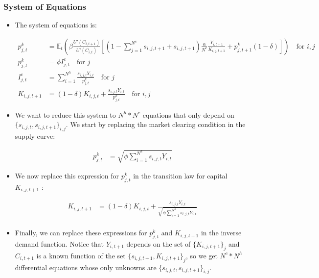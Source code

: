 \documentclass[11pt,english]{article}
\newcommand{\E}{\mathbb{E}}
\begin{document}
\subsubsection{System of Equations}

\begin{itemize}
	
	\item The system of equations is:
	
	\begin{align*}
	p^k_{j,t}  & =   \E_t \left( \beta \frac{U'(C_{i,t+1})}{U'(C_{i,t})} \left[ (1-\sum_{j=1}^{N^c} s_{i,j,t+1} + s_{i,j,t+1}) \frac{\alpha}{N^c} \frac{Y_{i,t+1}}{K_{i,j,t+1}} + p^k_{j,t+1} (1-\delta)  \right]  \right) \quad \text{for } i,j \\
	p^k_{j,t} & = \phi I^c_{j,t} \quad \text{for } j\\
	I_{j,t}^c & = \sum_{i=1}^{N^h} \frac{ s_{i,j,t} Y_{i,t} }{p^k_{j,t}}  \quad \text{for } j\\
	K_{i,j,t+1} & = (1-\delta) K_{i,j,t} + \frac{s_{i,j,t} Y_{i,t}}{p^k_{j,t}} \quad \text{for } i,j
	\end{align*}
	
	\item We want to reduce this system to $N^h*N^c$ equations that only depend on $\{s_{i,j,t}, s_{i,j,t+1}\}_{i,j}$. We start by replacing the market clearing condition in the supply curve:
	
	\begin{align*}
	p^k_{j,t} & = \sqrt{\phi \sum_{i=1}^{N^h}  s_{i,j,t} Y_{i,t}}
	\end{align*}
	
	\item We now replace this expression for $p^k_{j,t}$ in the transition law for capital $K_{i,j,t+1}$ :
	
	\begin{align}
	K_{i,j,t+1} & = (1-\delta) K_{i,j,t} + \frac{s_{i,j,t} Y_{i,t}}{ \sqrt{\phi \sum_{i=1}^{N^h}  s_{i,j,t} Y_{i,t}}} \\
	\end{align}
	
	\item Finally, we can replace these expressions for $p^k_{j,t}$ and $K_{i,j,t+1}$ in the inverse demand function. Notice that $Y_{i,t+1}$ depends on the set of $\{K_{i,j,t+1}\}_j$ and $C_{i,t+1}$ is a known function of the set $\{s_{i,j,t+1}, K_{i,j,t+1}\}_j$, so we get $N^c*N^h$ differential equations whose only unknowns are $\{s_{i,j,t}, s_{i,j,t+1}\}_{i,j}$.
	
\end{itemize}
		
\end{document}
